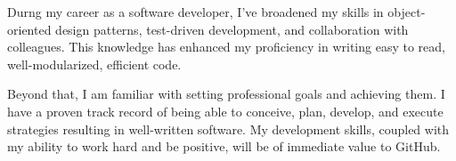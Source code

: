 Durng my career as a software developer, I’ve broadened my skills in object-oriented design patterns, test-driven development, and collaboration with colleagues. This knowledge has enhanced my proficiency in writing easy to read, well-modularized, efficient code.

Beyond that, I am familiar with setting professional goals and achieving them. I have a proven track record of being able to conceive, plan, develop, and execute strategies resulting in well-written software. My development skills, coupled with my ability to work hard and be positive, will be of immediate value to GitHub.